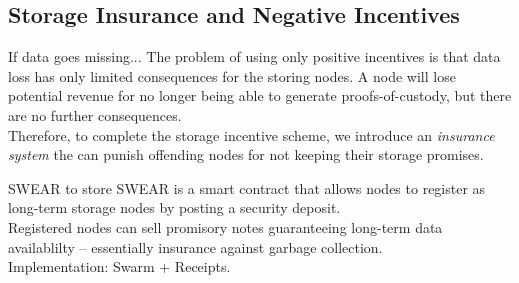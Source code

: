 \subsection[insurance]{Storage Insurance and Negative Incentives}
\begin{frame}{If data goes missing...}
 The problem of using only positive incentives is that data loss has only limited consequences for the storing nodes. A node will lose potential revenue for no longer being able to generate proofs-of-custody, but there are no further consequences. \\[5mm]
 Therefore, to complete the storage incentive scheme, we introduce an \emph{insurance system} the can punish offending nodes for not keeping their storage promises.
\end{frame}
\begin{frame}{SWEAR to store}
 SWEAR is a smart contract that allows nodes to register as long-term storage nodes by posting a security deposit.\\[5mm]
 Registered nodes can sell promisory notes guaranteeing long-term data availablilty -- essentially insurance against garbage collection. \\[5mm]
 Implementation: Swarm + Receipts.
\end{frame}

